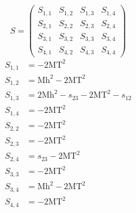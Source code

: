 \documentclass[a4paper]{article}
\begin{document}
\begin{equation}
S=\left(\begin{array}{cccc}
   S_{1,1}&
   S_{1,2}&
   S_{1,3}&
   S_{1,4}\\
   S_{2,1}&
   S_{2,2}&
   S_{2,3}&
   S_{2,4}\\
   S_{3,1}&
   S_{3,2}&
   S_{3,3}&
   S_{3,4}\\
   S_{4,1}&
   S_{4,2}&
   S_{4,3}&
   S_{4,4}\end{array}\right)
\end{equation}
\begin{subequations}
\begin{align}
   S_{1,1}&=-2\text{MT}^2\\
   S_{1,2}&=\text{Mh}^2-2\text{MT}^2\\
   S_{1,3}&=2\text{Mh}^2-s_{23}-2\text{MT}^2-s_{12}\\
   S_{1,4}&=-2\text{MT}^2\\
   S_{2,2}&=-2\text{MT}^2\\
   S_{2,3}&=-2\text{MT}^2\\
   S_{2,4}&=s_{23}-2\text{MT}^2\\
   S_{3,3}&=-2\text{MT}^2\\
   S_{3,4}&=\text{Mh}^2-2\text{MT}^2\\
   S_{4,4}&=-2\text{MT}^2
\end{align}
\end{subequations}
\end{document}

